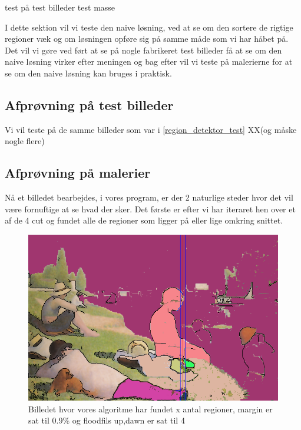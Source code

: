 test på test billeder
test masse


I dette sektion vil vi teste den naive løsning, ved at se om den sortere
de rigtige regioner væk og om løsningen opføre sig på samme måde som vi
har håbet på. Det vil vi gøre ved ført at se på nogle fabrikeret test
billeder få at se om den naive løsning virker efter meningen og bag
efter vil vi teste på malerierne for at se om den naive løsning kan
bruges i praktisk.
  
\subsection{Afprøvning på test billeder}
Vi vil teste på de samme billeder som var i \ref{region_detektor_test} XX(og måske nogle flere) 

\subsection{Afprøvning på malerier}
Nå et billedet bearbejdes, i vores program, er der 2 naturlige steder
hvor det vil være fornuftige at se hvad der sker. Det første er efter vi har
iteraret hen over et af de 4 cut og fundet alle de regioner som ligger
på eller lige omkring snittet.

\begin{figure}[h!!]
	\begin{center}
		\includegraphics[scale=0.42,angle=0]{afsnit/afprovning/billeder/floodfillbilledet.png}
	\end{center}
	\caption[]{Billedet hvor vores algoritme har fundet x antal regioner, margin er sat til 0.9\% og floodfils up,dawn er sat til 4}
	\label{ff}
\end{figure}

